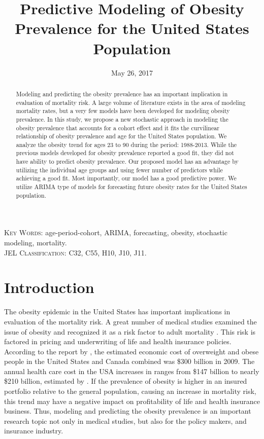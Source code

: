 \documentclass[11pt,letterpaper]{article}
\numberwithin{equation}{section}
\begin{document}
\title{\bf Predictive Modeling of Obesity Prevalence for the United States Population}
\date{May 26, 2017}
\maketitle

\doublespacing

\begin{abstract}
Modeling and predicting the obesity prevalence has an important implication in evaluation of mortality risk. A large volume of literature exists in the area of modeling mortality rates, but a very few models have been developed for modeling obesity prevalence. In this study, we propose a new stochastic approach in modeling the obesity prevalence that accounts for a cohort effect and it fits the curvilinear relationship of obesity prevalence and age for the United States population. We analyze the obesity trend for ages 23 to 90 during the period: 1988-2013. While the previous models developed for obesity prevalence reported a good fit, they did not have ability to predict obesity prevalence. Our proposed model has an advantage by utilizing the individual age groups and using fewer number of predictors while achieving a good fit. Most importantly, our model has a good predictive power. We utilize ARIMA type of models for forecasting future obesity rates for the United States population.
\end{abstract}
\textsc{Key Words:} age-period-cohort, ARIMA, forecasting, obesity, stochastic modeling, mortality.\\
\textsc{JEL Classification:} C32, C55, H10, J10, J11. \\


\section{Introduction}\label{sec:introduction}
The obesity epidemic in the United States has important implications in evaluation of the mortality risk. A great number of medical studies examined the issue of obesity and recognized it as a risk factor to adult mortality  \citep{Olshansky+Passaro+Hershow+Layden+Carnes+Brody+Hayflick+Butler+Allison+Ludwig:2005,Chatterjee+Macdonald+Waters:2008}. This risk is factored in pricing and underwriting of life and health insurance policies. According to the report by \cite{Behan+Cox+Lin+Pai+Pedersen+Yi:2010}, the estimated economic cost of overweight and obese people in the United States and Canada combined was \$300 billion in 2009. The annual health care cost in the USA increases in ranges from \$147 billion to nearly \$210 billion, estimated by \cite{Cawley+Meyerhoefer:2012}. If the prevalence of obesity is higher in an insured portfolio relative to the general population, causing an increase in mortality risk, this trend may have a negative impact on profitability of life and health insurance business. Thus, modeling and predicting the obesity prevalence is an important research topic not only in medical studies, but also for the policy makers, and insurance industry.
\end{document}
